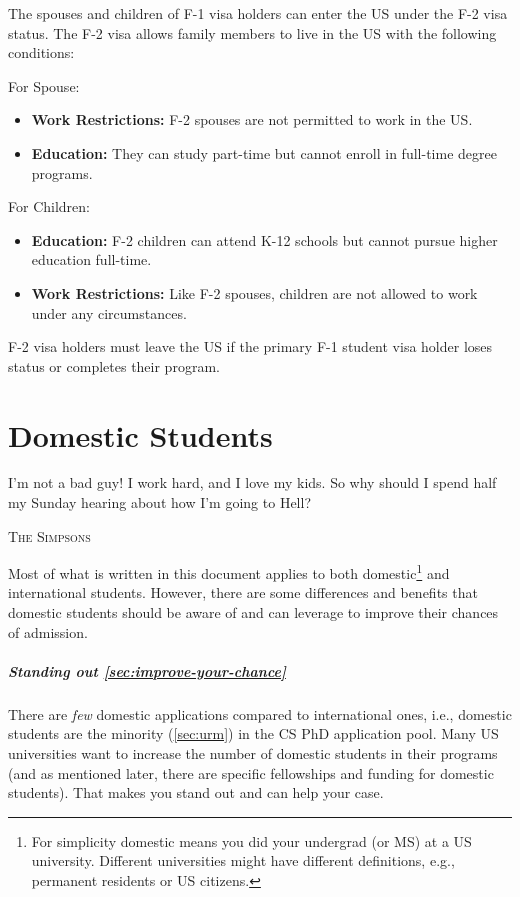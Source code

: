 \documentclass[oneside,11pt,dvipsnames]{book}
\def\chapterinfo#1{%
  \addcontentsline{toc}{chapterinfo}{%
    \noexpand\numberline{}\color{black}{#1}}%
}
\begin{document}
The spouses and children of F-1 visa holders can enter the US under the F-2 visa status. The F-2 visa allows family members to live in the US with the following conditions:

For Spouse: 
\begin{itemize}
\item \textbf{Work Restrictions:} F-2 spouses are not permitted to work in the US.
\item \textbf{Education:} They can study part-time but cannot enroll in full-time degree programs.
\end{itemize}
For Children:
\begin{itemize}
\item \textbf{Education:} F-2 children can attend K-12 schools but cannot pursue higher education full-time.
\item \textbf{Work Restrictions:} Like F-2 spouses, children are not allowed to work under any circumstances.
\end{itemize}
F-2 visa holders must leave the US if the primary F-1 student visa holder loses status or completes their program.

\chapter{Domestic Students}\label{sec:domestic-students}
\chapterinfo{Specific benefits and opportunities for domestic students applying to CS PhD programs.}

\epigraph{\vspace{-0.2in} I’m not a bad guy! I work hard, and I love my kids. So why should I spend half my Sunday hearing about how I’m going to Hell?}{\textsc{The Simpsons}}

Most of what is written in this document applies to both domestic\footnote{For simplicity domestic means you did your undergrad (or MS) at a US university. Different universities might have different definitions, e.g., permanent residents or US citizens.} and international students.  However, there are some differences and benefits that domestic students should be aware of and can leverage to improve their chances of admission.
\paragraph{Standing out \autoref{sec:improve-your-chance}} There are \emph{few} domestic applications compared to international ones, i.e., domestic students are the minority (\autoref{sec:urm}) in the CS PhD application pool. Many US universities want to increase the number of domestic students in their programs (and as mentioned later, there are specific fellowships and funding for domestic students).
That makes you stand out and can help your case.
\end{document}
